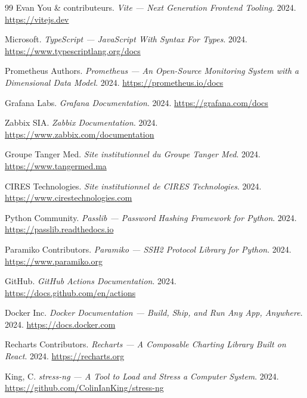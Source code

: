 \documentclass[11pt,a4paper]{report}
\begin{document}
\begin{thebibliography}{99}
Evan You \& contributeurs.
\textit{Vite — Next Generation Frontend Tooling}.
2024.
\url{https://vitejs.dev}

Microsoft.
\textit{TypeScript — JavaScript With Syntax For Types}.
2024.
\url{https://www.typescriptlang.org/docs}

Prometheus Authors.
\textit{Prometheus — An Open-Source Monitoring System with a Dimensional Data Model}.
2024.
\url{https://prometheus.io/docs}

Grafana Labs.
\textit{Grafana Documentation}.
2024.
\url{https://grafana.com/docs}

Zabbix SIA.
\textit{Zabbix Documentation}.
2024.
\url{https://www.zabbix.com/documentation}

Groupe Tanger Med.
\textit{Site institutionnel du Groupe Tanger Med}.
2024.
\url{https://www.tangermed.ma}

CIRES Technologies.
\textit{Site institutionnel de CIRES Technologies}.
2024.
\url{https://www.cirestechnologies.com}

Python Community.
\textit{Passlib — Password Hashing Framework for Python}.
2024.
\url{https://passlib.readthedocs.io}

Paramiko Contributors.
\textit{Paramiko — SSH2 Protocol Library for Python}.
2024.
\url{https://www.paramiko.org}

GitHub.
\textit{GitHub Actions Documentation}.
2024.
\url{https://docs.github.com/en/actions}

Docker Inc.
\textit{Docker Documentation — Build, Ship, and Run Any App, Anywhere}.
2024.
\url{https://docs.docker.com}

Recharts Contributors.
\textit{Recharts — A Composable Charting Library Built on React}.
2024.
\url{https://recharts.org}

King, C.
\textit{stress-ng — A Tool to Load and Stress a Computer System}.
2024.
\url{https://github.com/ColinIanKing/stress-ng}

\end{thebibliography}
\end{document}
